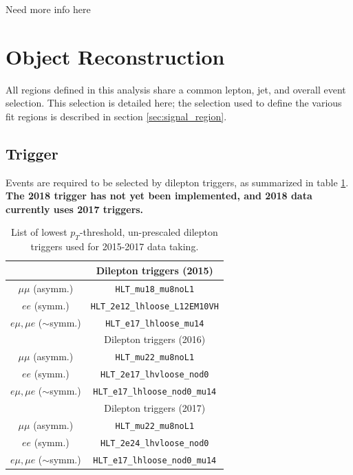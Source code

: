 \documentclass[NOTE, atlasdraft=true, texlive=2016, UKenglish]{\ATLASLATEXPATH atlasdoc}
\begin{document}
Need more info here

\section{Object Reconstruction}
\label{sec:obj}

All regions defined in this analysis share a common lepton, jet, and overall event selection. This selection is detailed here; the selection used to define the various fit regions is described in section \ref{sec:signal_region}.

\subsection{Trigger}

Events are required to be selected by dilepton triggers, as summarized in table \ref{tbl:trigger}. \textbf{The 2018 trigger has not yet been implemented, and 2018 data currently uses 2017 triggers.}

\begin{table}[h!]
 \begin{center}
   \begin{tabular}{cc}
     \toprule
                  & Dilepton triggers (2015) \\
     \midrule
      $\mu\mu$ (asymm.)          & \verb!HLT_mu18_mu8noL1! \\
      $ee$ (symm.)               & \verb!HLT_2e12_lhloose_L12EM10VH! \\
      $e\mu,\mu e$ ($\sim$symm.) & \verb!HLT_e17_lhloose_mu14! \\
     \bottomrule
                       & Dilepton triggers (2016) \\
     \midrule
      $\mu\mu$ (asymm.)                   & \verb!HLT_mu22_mu8noL1! \\
      $ee$ (symm.)                        & \verb!HLT_2e17_lhvloose_nod0! \\
      $e\mu,\mu e$ ($\sim$symm.)          & \verb!HLT_e17_lhloose_nod0_mu14! \\
     \bottomrule

                  & Dilepton triggers (2017) \\
     \midrule
      $\mu\mu$ (asymm.)                   & \verb!HLT_mu22_mu8noL1! \\
      $ee$ (symm.)                        & \verb!HLT_2e24_lhvloose_nod0! \\
      $e\mu,\mu e$ ($\sim$symm.)          & \verb!HLT_e17_lhloose_nod0_mu14! \\
     \bottomrule
   \end{tabular}
   \caption{\label{tbl:trigger} List of lowest $p_{T}$-threshold, un-prescaled dilepton triggers used for 2015-2017 data taking.}
 \end{center}
\end{table}
\end{document}
